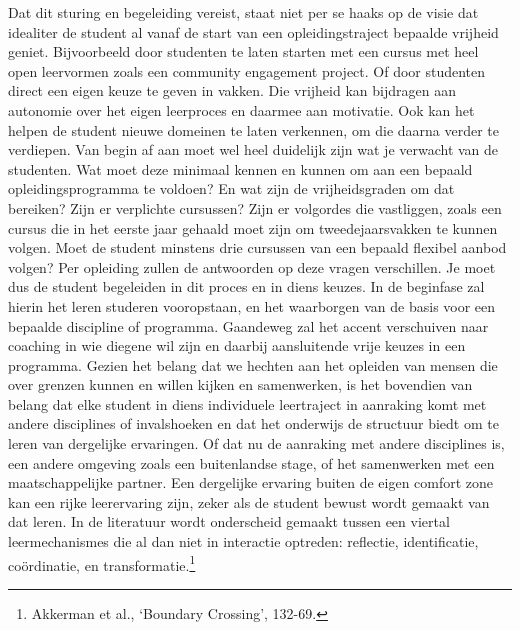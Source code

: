 \documentclass[smallauthor, chapterhaspagenum, nochapterinheader, pagenuminheader,  bigchapnum,medium2, tocpages, garamond, titleinheader]{jote-book}
\begin{document}
	Dat dit sturing en begeleiding vereist, staat niet per se haaks op de visie dat idealiter de student al vanaf de start van een opleidingstraject bepaalde vrijheid geniet. Bijvoorbeeld door studenten te laten starten met een cursus met heel open leervormen zoals een community engagement project. Of door studenten direct een eigen keuze te geven in vakken. Die vrijheid kan bijdragen aan autonomie over het eigen leerproces en daarmee aan motivatie. Ook kan het helpen de student nieuwe domeinen te laten verkennen, om die daarna verder te verdiepen. Van begin af aan moet wel heel duidelijk zijn wat je verwacht van de studenten. Wat moet deze minimaal kennen en kunnen om aan een bepaald opleidingsprogramma te voldoen? En wat zijn de vrijheidsgraden om dat bereiken? Zijn er verplichte cursussen? Zijn er volgordes die vastliggen, zoals een cursus die in het eerste jaar gehaald moet zijn om tweedejaarsvakken te kunnen volgen. Moet de student minstens drie cursussen van een bepaald flexibel aanbod volgen? Per opleiding zullen de antwoorden op deze vragen verschillen. Je moet dus de student begeleiden in dit proces en in diens keuzes. In de beginfase zal hierin het leren studeren vooropstaan, en het waarborgen van de basis voor een bepaalde discipline of programma. Gaandeweg zal het accent verschuiven naar coaching in wie diegene wil zijn en daarbij aansluitende vrije keuzes in een programma. Gezien het belang dat we hechten aan het opleiden van mensen die over grenzen kunnen en willen kijken en samenwerken, is het bovendien van belang dat elke student in diens individuele leertraject in aanraking komt met andere disciplines of invalshoeken en dat het onderwijs de structuur biedt om te leren van dergelijke ervaringen. Of dat nu de aanraking met andere disciplines is, een andere omgeving zoals een buitenlandse stage, of het samenwerken met een maatschappelijke partner. Een dergelijke ervaring buiten de eigen comfort zone kan een rijke leerervaring zijn, zeker als de student bewust wordt gemaakt van dat leren. In de literatuur wordt onderscheid gemaakt tussen een viertal leermechanismes die al dan niet in interactie optreden: reflectie, identificatie, coördinatie, en transformatie.\footnote{Akkerman et al., ‘Boundary Crossing', 132-69.}
\end{document}
